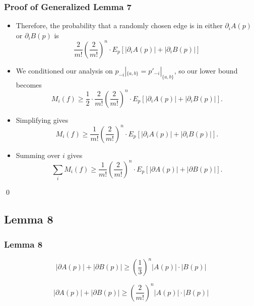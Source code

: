 \documentclass[aspectratio=169]{beamer}
\begin{document}
		\begin{frame}
			\frametitle{Proof of Generalized Lemma 7}

			\begin{itemize}
				\item Therefore, the probability that a randomly chosen edge is in either $\partial_i A(p)$ or $\partial_i B(p)$ is
					\[
						\frac{2}{m!} \left(\frac{2}{m!}\right)^{n} \cdot E_p \left[ |\partial_i A(p)| + |\partial_i B(p)| \right]
					\]
				\item We conditioned our analysis on $p_{-i}|_{\{a,b\}} = p'_{-i}|_{\{a,b\}}$, so our lower bound becomes
					\[
						M_i(f) \ge \frac{1}{2} \cdot \frac{2}{m!}\left(\frac{2}{m!}\right)^{n} \cdot E_p \left[ |\partial_i A(p)| + |\partial_i B(p)| \right].
					\]
				\item Simplifying gives
					\[
						M_i(f) \ge \frac{1}{m!}\left(\frac{2}{m!}\right)^{n} \cdot E_p \left[ |\partial_i A(p)| + |\partial_i B(p)| \right].
					\]
				\item Summing over $i$ gives
					\[
						\sum_i M_i(f) \ge \frac{1}{m!}\left(\frac{2}{m!}\right)^{n} \cdot E_p \left[ |\partial A(p)| + |\partial B(p)| \right].
					\]
			\end{itemize}

			\qed
		\end{frame}


	\subsection{Lemma 8}

		\begin{frame}
			\frametitle{Lemma 8}

			\begin{lemma}
				\[
					|\partial A(p)| + |\partial B(p)| \ge \left( \frac{1}{3} \right)^n |A(p)| \cdot |B(p)|
				\]
			\end{lemma}

			\begin{lemma}
				\[
					|\partial A(p)| + |\partial B(p)| \ge \left( \frac{2}{m!} \right)^n |A(p)| \cdot |B(p)|
				\]
			\end{lemma}

		\end{frame}
\end{document}
